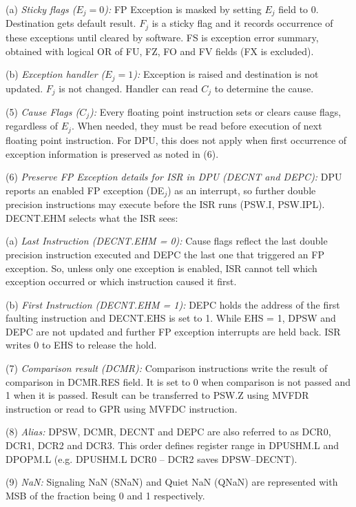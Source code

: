     \leveltwo
    (a) \emph{Sticky flags ($E_j = 0$):} %
    FP Exception is masked by setting $E_j$ field to 0. Destination gets default result. $F_j$ is 
    a sticky flag and it records occurrence of these exceptions until cleared by software. FS is 
    exception error summary, obtained with logical OR of FU, FZ, FO and FV fields (FX is excluded).

    (b) \emph{Exception handler ($E_j = 1$):} %
    Exception is raised and destination is not updated. $F_j$ is not changed. Handler can read 
    $C_j$ to determine the cause.

\levelone    
(5) \emph{Cause Flags ($C_j$):} %
Every floating point instruction sets or clears cause flags, regardless of $E_j$. When needed, 
they must be read before execution of next floating point instruction. For DPU, this does not 
apply when first occurrence of exception information is preserved as noted in (6).

(6) \emph{Preserve FP Exception details for ISR in DPU (DECNT and DEPC):} %
DPU reports an enabled FP exception (DE$_j$) as an interrupt, so further double precision 
instructions may execute before the ISR runs (PSW.I, PSW.IPL). DECNT.EHM selects what the ISR sees:

    \leveltwo
    (a) \emph{Last Instruction (DECNT.EHM = 0):} %
    Cause flags reflect the last double precision instruction executed and DEPC the last one that 
    triggered an FP exception. So, unless only one exception is enabled, ISR cannot tell which 
    exception occurred or which instruction caused it first.

    (b) \emph{First Instruction (DECNT.EHM = 1):} %
    DEPC holds the address of the first faulting instruction and DECNT.EHS is set to 1. While 
    EHS = 1, DPSW and DEPC are not updated and further FP exception interrupts are held back. 
    ISR writes 0 to EHS to release the hold.

\levelone
(7) \emph{Comparison result (DCMR):} %
Comparison instructions write the result of comparison in DCMR.RES field. It is set to 0 when 
comparison is not passed and 1 when it is passed. Result can be transferred to PSW.Z using 
MVFDR instruction or read to GPR using MVFDC instruction.

(8) \emph{Alias:} %
DPSW, DCMR, DECNT and DEPC are also referred to as DCR0, DCR1, DCR2 and DCR3. This order defines
register range in DPUSHM.L and DPOPM.L (e.g. DPUSHM.L DCR0 -- DCR2 saves DPSW--DECNT).

\levelone
(9) \emph{NaN:} %
Signaling NaN (SNaN) and Quiet NaN (QNaN) are represented with MSB of the fraction being 0 and 
1 respectively. 



